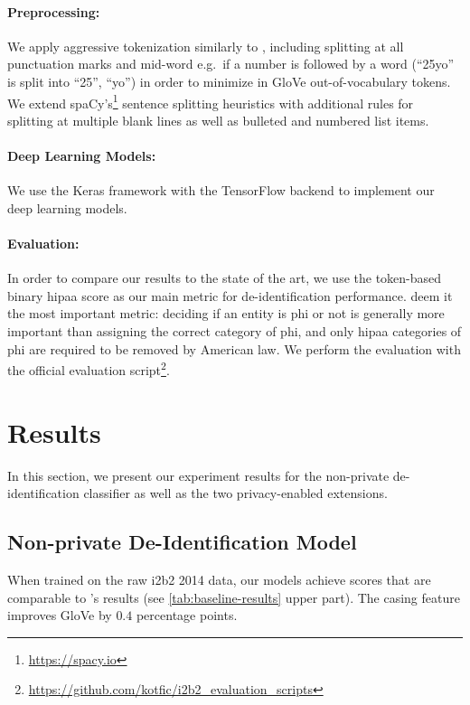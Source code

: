 \paragraph{Preprocessing:}
%
We apply aggressive tokenization similarly to \citet{liu2017identification}, including splitting at all punctuation marks and mid-word e.g.\ if a number is followed by a word (``25yo'' is split into ``25'', ``yo'') in order to minimize in GloVe out-of-vocabulary tokens.
%
We extend spaCy's\footnote{\url{https://spacy.io}} sentence splitting heuristics with additional rules for splitting at multiple blank lines as well as bulleted and numbered list items.

\paragraph{Deep Learning Models:}
%
We use the Keras framework \citep{chollet2015keras} with the TensorFlow backend \citep{abadi2015tensorflow} to implement our deep learning models.
%

\paragraph{Evaluation:}
%
In order to compare our results to the state of the art, we use the token-based binary \ac{hipaa} \fone score as our main metric for de-identification performance.
%
\citet{dernoncourt2017identification} deem it the most important metric: deciding if an entity is \ac{phi} or not is generally more important than assigning the correct category of \ac{phi}, and only \ac{hipaa} categories of \ac{phi} are required to be removed by American law.
%
We perform the evaluation with the official evaluation script\footnote{\url{https://github.com/kotfic/i2b2\_evaluation\_scripts}}.

\section{Results}
%
In this section, we present our experiment results for the non-private de-identification classifier as well as the two privacy-enabled extensions.

\subsection{Non-private De-Identification Model}
%
When trained on the raw i2b2 2014 data, our models achieve \fone scores that are comparable to \citeauthor{dernoncourt2017identification}'s results (see \cref{tab:baseline-results} upper part).
%
The casing feature improves GloVe by $0.4$ percentage points.

